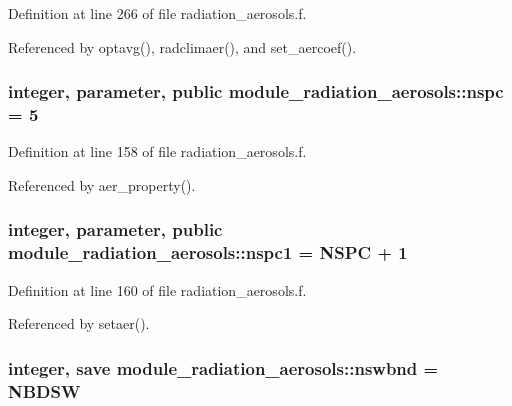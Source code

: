Definition at line 266 of file radiation\+\_\+aerosols.\+f.



Referenced by optavg(), radclimaer(), and set\+\_\+aercoef().

\subsubsection[{\texorpdfstring{nspc}{nspc}}]{\setlength{\rightskip}{0pt plus 5cm}integer, parameter, public module\+\_\+radiation\+\_\+aerosols\+::nspc = 5}\hypertarget{group__module__radiation__aerosols_ga3d126c465af80bb698d9d1a288c181bb}{}\label{group__module__radiation__aerosols_ga3d126c465af80bb698d9d1a288c181bb}


Definition at line 158 of file radiation\+\_\+aerosols.\+f.



Referenced by aer\+\_\+property().

\subsubsection[{\texorpdfstring{nspc1}{nspc1}}]{\setlength{\rightskip}{0pt plus 5cm}integer, parameter, public module\+\_\+radiation\+\_\+aerosols\+::nspc1 = N\+S\+PC + 1}\hypertarget{group__module__radiation__aerosols_ga476c0181513603112dec3f4d2a2ec839}{}\label{group__module__radiation__aerosols_ga476c0181513603112dec3f4d2a2ec839}


Definition at line 160 of file radiation\+\_\+aerosols.\+f.



Referenced by setaer().

\subsubsection[{\texorpdfstring{nswbnd}{nswbnd}}]{\setlength{\rightskip}{0pt plus 5cm}integer, save module\+\_\+radiation\+\_\+aerosols\+::nswbnd = N\+B\+D\+SW\hspace{0.3cm}{\ttfamily [private]}}\hypertarget{group__module__radiation__aerosols_ga1d6c41e3bb818aa8b6f8f10d1c3f38a7}{}\label{group__module__radiation__aerosols_ga1d6c41e3bb818aa8b6f8f10d1c3f38a7}


